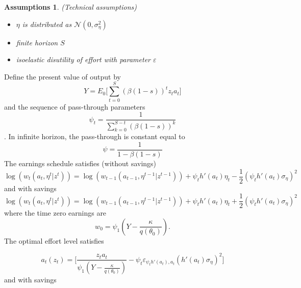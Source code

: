 \documentclass[11pt,a4paper]{article}
\newtheorem{assumption}[theorem]{Assumptions}
\begin{document}
\begin{assumption} (Technical assumptions)
\begin{itemize}
    \item $\eta$ is distributed as $\mathcal{N}(0,\sigma^2_{\eta})$
    \item finite horizon $S$
    \item isoelastic disutility of effort with parameter $\varepsilon$
    
\end{itemize}
\end{assumption}
\begin{proposition}
Define the present value of output by 
$$Y=E_0 \Big[\sum_{t=0}^{S} (\beta (1-s))^t z_t a_{t} \Big]$$ and the sequence of pass-through parameters $$\psi_t=\frac{1}{\sum_{k=0}^{S-t}(\beta (1-s))^{k}}$$. In infinite horizon, the pass-through is constant equal to 
$$\psi=\frac{1}{1-\beta (1-s)}$$
The earnings schedule satisfies (without savings)
$$\log(w_t(a_t,\eta^t|z^t))=\log(w_{t-1}(a_{t-1},\eta^{t-1}|z^{t-1}))+\psi_t h'(a_t)\eta_t-\frac{1}{2}(\psi_t h'(a_t)\sigma_{\eta})^2$$
and with savings
$$\boxed{\log(w_t(a_t,\eta^t|z^t))=\log(w_{t-1}(a_{t-1},\eta^{t-1}|z^{t-1}))+\psi_t h'(a_t)\eta_t+\frac{1}{2}(\psi_t h'(a_t)\sigma_{\eta})^2}$$
where the time zero earnings are $$w_0= \psi_1(Y-\frac{\kappa}{q(\theta_0)}).$$
The optimal effort level satisfies

$$a_t(z_t)=\Big[\frac{z_t a_t}{\psi_1(Y-\frac{\kappa}{q(\theta_0)})}-\psi_t\varepsilon_{\psi_t h'(a_t), a_t}(h'(a_t)\sigma_{\eta})^2\Big]$$
and with savings

\end{proposition}
\end{document}
